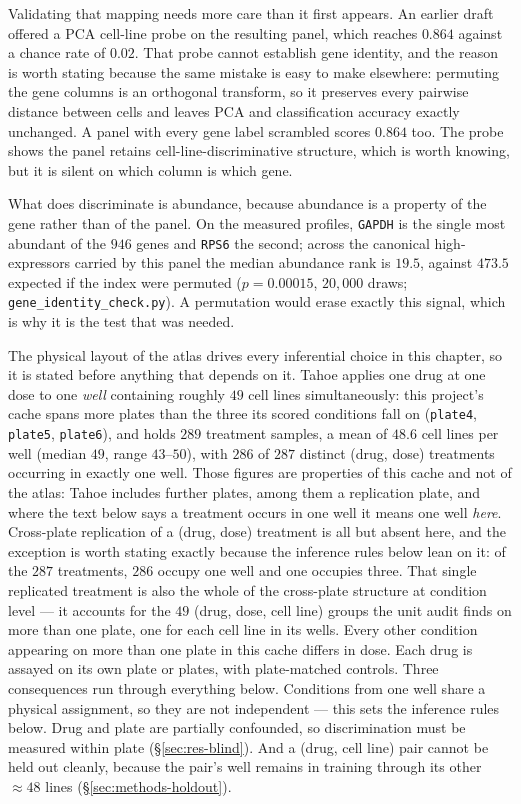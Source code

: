 Validating that mapping needs more care than it first appears. An earlier draft offered a PCA
cell-line probe on the resulting panel, which reaches $0.864$ against a chance rate of $0.02$. That
probe cannot establish gene identity, and the reason is worth stating because the same mistake is
easy to make elsewhere: permuting the gene columns is an orthogonal transform, so it preserves every
pairwise distance between cells and leaves PCA and classification accuracy exactly unchanged. A
panel with every gene label scrambled scores $0.864$ too. The probe shows the panel retains
cell-line-discriminative structure, which is worth knowing, but it is silent on which column is
which gene.

What does discriminate is abundance, because abundance is a property of the gene rather than of the
panel. On the measured profiles, \texttt{GAPDH} is the single most abundant of the $946$ genes and
\texttt{RPS6} the second; across the canonical high-expressors carried by this panel the median
abundance rank is $19.5$, against $473.5$ expected if the index were permuted
($p = 0.00015$, $20{,}000$ draws; \texttt{gene\_identity\_check.py}). A permutation would erase
exactly this signal, which is why it is the test that was needed.

The physical layout of the atlas drives every inferential choice in this chapter, so it is stated
before anything that depends on it. Tahoe applies one drug at one dose to one \emph{well} containing
roughly $49$ cell lines simultaneously: this project's cache spans more plates than the three its
scored conditions fall on (\texttt{plate4}, \texttt{plate5}, \texttt{plate6}), and holds $289$
treatment samples, a mean of
$48.6$ cell lines per well (median $49$, range $43$--$50$), with $286$ of $287$ distinct (drug, dose)
treatments occurring in exactly one well. Those figures are properties of this cache and not of the
atlas: Tahoe includes further plates, among them a replication plate, and where the text below says
a treatment occurs in one well it means one well \emph{here}. Cross-plate replication of a (drug, dose) treatment is all but absent
here, and the exception is worth stating exactly because the inference rules below lean on it: of
the $287$ treatments, $286$ occupy one well and one occupies three. That single replicated treatment
is also the whole of the cross-plate structure at condition level --- it accounts for the $49$
(drug, dose, cell line) groups the unit audit finds on more than one plate, one for each cell line
in its wells. Every other condition appearing on more than one plate in this cache differs in dose. Each drug is assayed on its own plate or plates, with
plate-matched controls. Three consequences run through everything below.
Conditions from one well share a physical assignment, so they are not independent --- this sets the
inference rules below. Drug and plate are partially confounded, so discrimination must be measured
within plate (\S\ref{sec:res-blind}). And a (drug, cell line) pair cannot be held out cleanly,
because the pair's well remains in training through its other $\approx 48$ lines
(\S\ref{sec:methods-holdout}).

